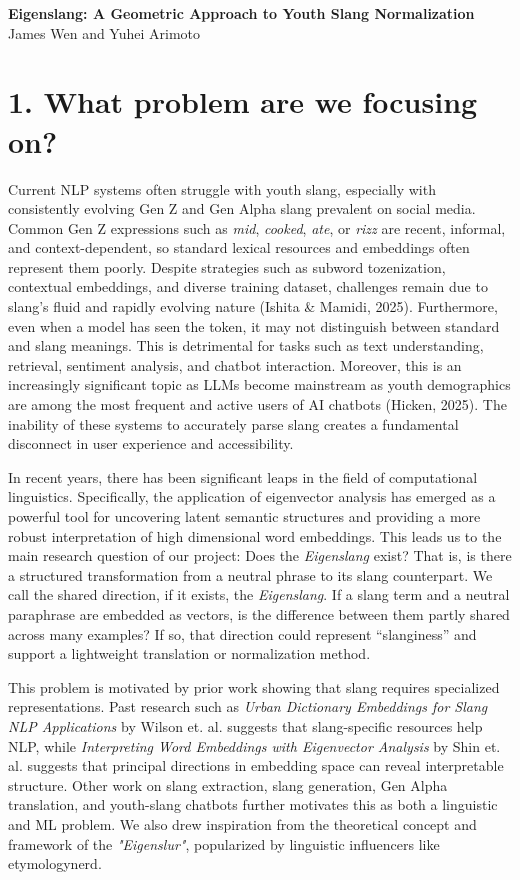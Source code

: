 \documentclass[11pt]{article}
\begin{document}
\begin{center}
{\large\bfseries Eigenslang: A Geometric Approach to Youth Slang Normalization}\\
\vspace{0.2em}
James Wen and Yuhei Arimoto
\end{center}
\vspace{-0.5em}

\section*{1. What problem are we focusing on?}
\qquad Current NLP systems often struggle with youth slang, especially with consistently evolving Gen Z and Gen Alpha slang prevalent on social media.  Common Gen Z expressions such as \textit{mid}, \textit{cooked}, \textit{ate}, or \textit{rizz} are recent, informal, and context-dependent, so standard lexical resources and embeddings often represent them poorly. Despite strategies such as subword tozenization, contextual embeddings, and diverse training dataset, challenges remain due to slang's fluid and rapidly evolving nature (Ishita \& Mamidi, 2025). Furthermore, even when a model has seen the token, it may not distinguish between standard and slang meanings. This is detrimental for tasks such as text understanding, retrieval, sentiment analysis, and chatbot interaction. Moreover, this is an increasingly significant topic as LLMs become mainstream as youth demographics are among the most frequent and active users of AI chatbots (Hicken, 2025). The inability of these systems to accurately parse slang creates a fundamental disconnect in user experience and accessibility.

In recent years, there has been significant leaps in the field of computational linguistics. Specifically, the application of eigenvector analysis has emerged as a powerful tool for uncovering latent semantic structures and providing a more robust interpretation of high dimensional word embeddings. This leads us to the main research question of our project: Does the \emph{Eigenslang} exist? That is, is there a structured transformation from a neutral phrase to its slang counterpart. We call the shared direction, if it exists, the \emph{Eigenslang}. If a slang term and a neutral paraphrase are embedded as vectors, is the difference between them partly shared across many examples? If so, that direction could represent ``slanginess'' and support a lightweight translation or normalization method.

This problem is motivated by prior work showing that slang requires specialized representations. Past research such as \textit{Urban Dictionary Embeddings for Slang NLP Applications} by Wilson et. al. suggests that slang-specific resources help NLP, while \textit{Interpreting Word Embeddings with Eigenvector Analysis} by Shin et. al. suggests that principal directions in embedding space can reveal interpretable structure. Other work on slang extraction, slang generation, Gen Alpha translation, and youth-slang chatbots further motivates this as both a linguistic and ML problem. We also drew inspiration from the theoretical concept and framework of the \textit{"Eigenslur"}, popularized by linguistic influencers like 
etymologynerd.
\end{document}
